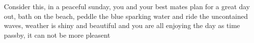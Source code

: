 Consider this, in a peaceful sunday, you and your best mates plan for a great day out, bath on the beach, peddle the blue sparking water and ride the uncontained waves, weather is shiny and beautiful and you are all enjoying the day as time passby, it can not be more pleasent 